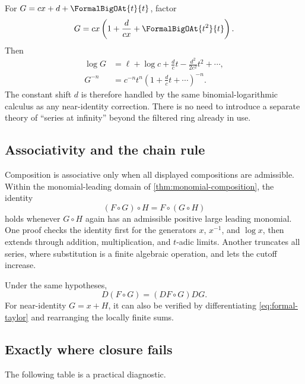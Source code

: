 \documentclass[11pt,oneside]{article}
\numberwithin{equation}{section}
\theoremstyle{definition}
\begin{document}
For \(G=cx+d+\FormalBigOAt{t}{t}\), factor
\[
  G=cx\left(1+\frac{d}{cx}+\FormalBigOAt{t^2}{t}\right).
\]
Then
\begin{align*}
  \log G
  &=\ell+\log c+\frac{d}{c}t-\frac{d^2}{2c^2}t^2+\cdots,\\
  G^{-n}
  &=c^{-n}t^n\left(1+\frac{d}{c}t+\cdots\right)^{-n}.
\end{align*}
The constant shift \(d\) is therefore handled by the same binomial-logarithmic
calculus as any near-identity correction.  There is no need to introduce a
separate theory of ``series at infinity'' beyond the filtered ring already in
use.

\subsection{Associativity and the chain rule}

Composition is associative only when all displayed compositions are admissible.
Within the monomial-leading domain of \cref{thm:monomial-composition}, the
identity
\begin{equation}\label{eq:composition-associativity}
  (F\circ G)\circ H=F\circ(G\circ H)
\end{equation}
holds whenever \(G\circ H\) again has an admissible positive large leading
monomial.  One proof checks the identity first for the generators \(x\),
\(x^{-1}\), and \(\log x\), then extends through addition, multiplication, and
\(t\)-adic limits.  Another truncates all series, where substitution is a finite
algebraic operation, and lets the cutoff increase.

Under the same hypotheses,
\begin{equation}\label{eq:chain-rule}
  D(F\circ G)=(DF\circ G)DG.
\end{equation}
For near-identity \(G=x+H\), it can also be verified by differentiating
\eqref{eq:formal-taylor} and rearranging the locally finite sums.

\subsection{Exactly where closure fails}

The following table is a practical diagnostic.
\end{document}
